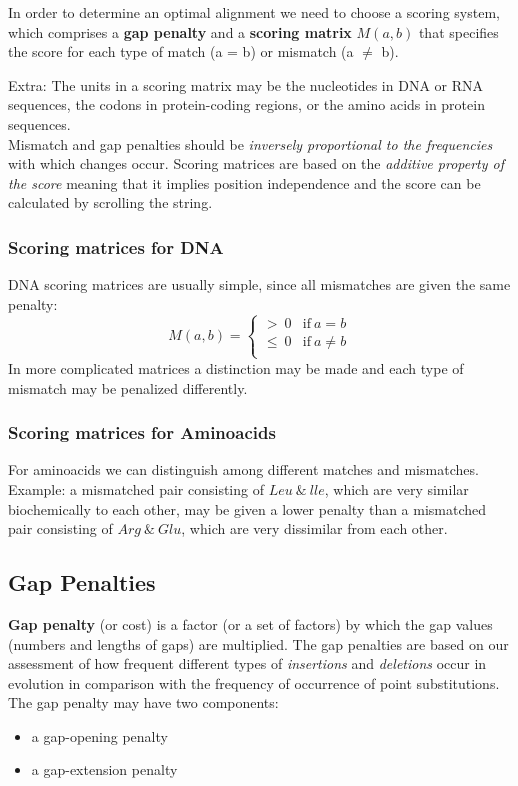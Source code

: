 In order to determine an optimal alignment we need to choose a scoring system, which comprises a \textbf{gap penalty} and a \textbf{scoring matrix} $M(a,b)$ that specifies the score for each type of match (a = b) or mismatch (a $\neq$ b). 

Extra: The units in a scoring matrix may be the nucleotides in DNA or RNA sequences, the codons in protein-coding regions, or the amino acids in protein sequences.\\

Mismatch and gap penalties should be \textit{inversely proportional to the frequencies} with which changes occur. Scoring matrices are based on the \textit{additive property of the score} meaning that it implies position independence and the score can be calculated by scrolling the string.
\newpage
\subsubsection{Scoring matrices for DNA}
DNA scoring matrices are usually simple, since all mismatches are given the same penalty:
$$M(a,b) = \begin{cases}
>~0 & \text{if}~a = b\\ 
\leq~0 & \text{if}~a \neq b\\
\end{cases}$$
In more complicated matrices a distinction may be made and each type of mismatch may be penalized differently.

\subsubsection{Scoring matrices for Aminoacids}
For aminoacids we can distinguish among different matches and mismatches. Example: a mismatched pair consisting of $Leu~\&~lle$, which are very similar biochemically to each other, may be given a lower penalty than a mismatched pair consisting of $Arg~\&~Glu$, which are very dissimilar from each other.

\subsection{Gap Penalties}
\textbf{Gap penalty} (or cost) is a factor (or a set of factors) by which the gap values (numbers and lengths of gaps) are multiplied. The gap penalties are based on our assessment of how frequent different types of \textit{insertions} and \textit{deletions} occur in evolution in comparison with the frequency of occurrence of point substitutions.\\
The gap penalty may have two components:
\begin{itemize}
	\item a gap-opening penalty
	\item a gap-extension penalty
\end{itemize}

